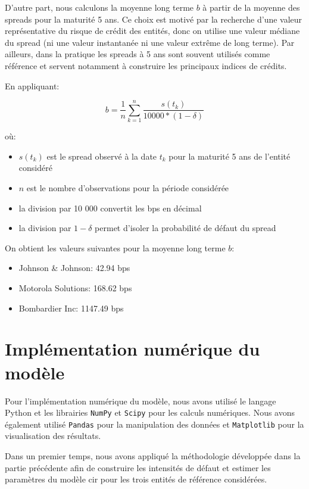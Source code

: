 D'autre part, nous calculons la moyenne long terme $b$ à partir de la moyenne des spreads pour la maturité 5 ans. Ce choix est motivé par la recherche d'une valeur représentative du risque de crédit des entités, donc on utilise une valeur médiane du spread (ni une valeur instantanée ni une valeur extrême de long terme). Par ailleurs, dans la pratique les spreads à 5 ans sont souvent utilisés comme référence et servent notamment à construire les principaux indices de crédits.

En appliquant:

$$b = \frac{1}{n} \sum_{k = 1}^n \frac{s(t_k)}{10000 * (1 - \delta)}$$

où:

\begin{itemize}
    \item[\textbullet] $s(t_k)$ est le spread observé à la date $t_k$ pour la maturité 5 ans de l'entité considéré
    \item[\textbullet] $n$ est le nombre d'observations pour la période considérée
    \item[\textbullet] la division par 10 000 convertit les bps en décimal
    \item[\textbullet] la division par $1 - \delta$ permet d'isoler la probabilité de défaut du spread
\end{itemize}


On obtient les valeurs suivantes pour la moyenne long terme $b$:

\begin{itemize}
    \item Johnson \& Johnson: 42.94 bps
    \item Motorola Solutions: 168.62 bps
    \item Bombardier Inc: 1147.49 bps
\end{itemize}


\chapter{Implémentation numérique du modèle}

Pour l'implémentation numérique du modèle, nous avons utilisé le langage Python et les librairies \texttt{NumPy} et \texttt{Scipy} pour les calculs numériques. Nous avons également utilisé \texttt{Pandas} pour la manipulation des données et \texttt{Matplotlib} pour la visualisation des résultats.

Dans un premier temps, nous avons appliqué la méthodologie développée dans la partie précédente afin de construire les intensités de défaut et estimer les paramètres du modèle \gls{cir} pour les trois entités de référence considérées.


